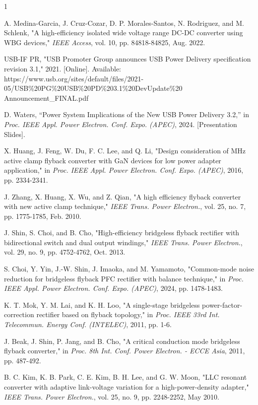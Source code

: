 \documentclass[lettersize,journal]{IEEEtran}
\begin{document}
\begin{thebibliography}{1}


A. Medina-Garcia, J. Cruz-Cozar, D. P. Morales-Santos, N. Rodriguez, and M. Schlenk, "A high-efficiency isolated wide voltage range DC-DC converter using WBG devices," \textit{IEEE Access}, vol. 10, pp. 84818-84825, Aug. 2022.

USB-IF PR, "USB Promoter Group announces USB Power Delivery specification revision 3.1," 2021. [Online]. Available: https://www.usb.org/sites/default/files/2021-05/USB\%20PG\%20USB\%20PD\%203.1\%20DevUpdate\%20\\Announcement\_FINAL.pdf

D. Waters, ``Power System Implications of the New USB Power Delivery 3.2,'' in \textit{Proc. IEEE Appl. Power Electron. Conf. Expo. (APEC)}, 2024. [Presentation Slides].

X. Huang, J. Feng, W. Du, F. C. Lee, and Q. Li, "Design consideration of MHz active clamp flyback converter with GaN devices for low power adapter application," in \textit{Proc. IEEE Appl. Power Electron. Conf. Expo. (APEC)}, 2016, pp. 2334-2341.

J. Zhang, X. Huang, X. Wu, and Z. Qian, "A high efficiency flyback converter with new active clamp technique," \textit{IEEE Trans. Power Electron.}, vol. 25, no. 7, pp. 1775-1785, Feb. 2010.


J. Shin, S. Choi, and B. Cho, "High-efficiency bridgeless flyback rectifier with bidirectional switch and dual output windings," \textit{IEEE Trans. Power Electron.}, vol. 29, no. 9, pp. 4752-4762, Oct. 2013.

S. Choi, Y. Yin, J.-W. Shin, J. Imaoka, and M. Yamamoto, "Common-mode noise reduction for bridgeless flyback PFC rectifier with balance technique," in \textit{Proc. IEEE Appl. Power Electron. Conf. Expo. (APEC)}, 2024, pp. 1478-1483.

K. T. Mok, Y. M. Lai, and K. H. Loo, "A single-stage bridgeless power-factor-correction rectifier based on flyback topology," in \textit{Proc. IEEE 33rd Int. Telecommun. Energy Conf. (INTELEC)}, 2011, pp. 1-6.

J. Beak, J. Shin, P. Jang, and B. Cho, "A critical conduction mode bridgeless flyback converter," in \textit{Proc. 8th Int. Conf. Power Electron. - ECCE Asia}, 2011, pp. 487-492.

B. C. Kim, K. B. Park, C. E. Kim, B. H. Lee, and G. W. Moon, "LLC resonant converter with adaptive link-voltage variation for a high-power-density adapter," \textit{IEEE Trans. Power Electron.}, vol. 25, no. 9, pp. 2248-2252, May 2010.


\end{thebibliography}
\end{document}
